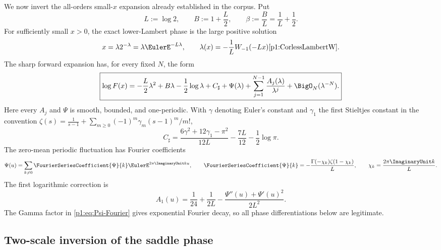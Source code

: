 \documentclass[11pt,oneside]{article}
\numberwithin{equation}{section}
\theoremstyle{definition}
\theoremstyle{remark}
\begin{document}
We now invert the all-orders small-$x$ expansion already established in the corpus.
Put
\begin{equation}
 L:=\log2,
 \qquad B:=1+\frac L2,
 \qquad \beta:=\frac BL=\frac1L+\frac12.
 \label{p1:eq:L-B-beta}
\end{equation}
For sufficiently small $x>0$, the exact lower-Lambert phase is the large positive
solution
\begin{equation}
 x=\lambda2^{-\lambda}=\lambda\EulerE^{-L\lambda},
 \qquad
 \lambda(x)=-\frac1L W_{-1}(-Lx) \cite{p1:CorlessLambertW}.
 \label{p1:eq:exact-lower-Lambert}
\end{equation}
The sharp forward expansion has, for every fixed $N$, the form
\begin{equation}
 \boxed{
 \log F(x)=
 -\frac L2\lambda^2+B\lambda-\frac12\log\lambda
 +C_{\sharp}+\Psi(\lambda)
 +\sum_{j=1}^{N-1}\frac{A_j(\lambda)}{\lambda^j}
 +\BigO_N(\lambda^{-N}).}
 \label{p1:eq:forward-endpoint-all-orders}
\end{equation}
Here every $A_j$ and $\Psi$ is smooth, bounded, and one-periodic.  With
$\gamma$ denoting Euler's constant and $\gamma_1$ the first Stieltjes constant in the
convention
\(
 \zeta(s)=\frac1{s-1}+\sum_{m\ge0}(-1)^m\gamma_m(s-1)^m/m!
\),
\begin{equation}
 C_{\sharp}=
 \frac{6\gamma^2+12\gamma_1-\pi^2}{12L}
 -\frac{7L}{12}-\frac12\log\pi.
 \label{p1:eq:Csharp}
\end{equation}
The zero-mean periodic fluctuation has Fourier coefficients
\begin{equation}
 \Psi(u)=\sum_{k\ne0}\FourierSeriesCoefficient{\Psi}{k}
 \EulerE^{2\pi\ImaginaryUnit ku},
 \qquad
 \FourierSeriesCoefficient{\Psi}{k}
 =-\frac{\Gamma(-\chi_k)\zeta(1-\chi_k)}{L},
 \qquad
 \chi_k=\frac{2\pi\ImaginaryUnit k}{L}.
 \label{p1:eq:Psi-Fourier}
\end{equation}
The first logarithmic correction is
\begin{equation}
 \boxed{
 A_1(u)=\frac1{24}+\frac1{2L}
 -\frac{\Psi''(u)+\Psi'(u)^2}{2L^2}.}
 \label{p1:eq:A1-periodic}
\end{equation}
The Gamma factor in \eqref{p1:eq:Psi-Fourier} gives exponential Fourier decay, so all
phase differentiations below are legitimate.

\subsection{Two-scale inversion of the saddle phase}
\end{document}

